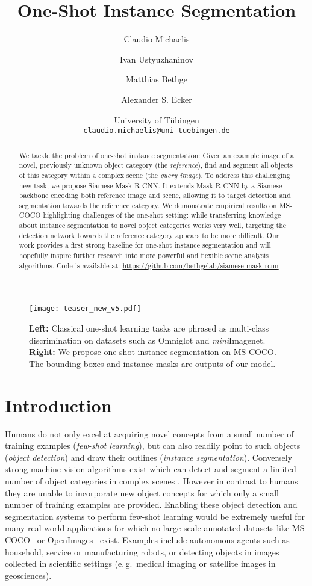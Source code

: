 \documentclass{article}
\title{One-Shot Instance Segmentation}
\author{Claudio Michaelis\\
\and
Ivan Ustyuzhaninov\\
\and
Matthias Bethge\\
\and
Alexander S. Ecker\\
\and
University of T\"ubingen\\
{\tt\small claudio.michaelis@uni-tuebingen.de}
}
\newcommand{\coco}{MS-COCO\xspace}
\begin{document}
\maketitle

\begin{abstract}
   We tackle the problem of one-shot instance segmentation: Given an example image of a novel, previously unknown object category (the \emph{reference}), find and segment all objects of this category within a complex scene (the \emph{query image}).
   To address this challenging new task, we propose Siamese Mask R-CNN. It extends Mask R-CNN by a Siamese backbone encoding both reference image and scene, allowing it to target detection and segmentation towards the reference category.
   We demonstrate empirical results on \coco highlighting challenges of the one-shot setting: while transferring knowledge about instance segmentation to novel object categories works very well, targeting the detection network towards the reference category appears to be more difficult.
   Our work provides a first strong baseline for one-shot instance segmentation and will hopefully inspire further research into more powerful and flexible scene analysis algorithms. Code is available at: \url{https://github.com/bethgelab/siamese-mask-rcnn}
\end{abstract}

\begin{figure}[h]
    \centering
    \texttt{[image: teaser\_new\_v5.pdf]}
    \caption{\textbf{Left:} Classical one-shot learning tasks are phrased as multi-class discrimination on datasets such as Omniglot and \emph{mini}Imagenet. \textbf{Right:} We propose one-shot instance segmentation on \coco.
The bounding boxes and instance masks are outputs of our model.}
    \label{fig:teaser}
\end{figure}

\section{Introduction}
\label{sec:introduction}



Humans do not only excel at acquiring novel concepts from a small number of training examples (\emph{few-shot learning}), but can also readily point to such objects (\emph{object detection}) and draw their outlines (\emph{instance segmentation}). Conversely strong machine vision algorithms exist which can detect and segment a limited number of object categories in complex scenes \cite{Redmon2018, Lin2017b, He2017}. However in contrast to humans they are unable to incorporate new object concepts for which only a small number of training examples are provided. Enabling these object detection and segmentation systems to perform few-shot learning would be extremely useful for many real-world applications for which no large-scale annotated datasets like \coco~\cite{Lin2014} or OpenImages~\cite{Krasin2017} exist. Examples include autonomous agents such as household, service or manufacturing robots, or detecting objects in images collected in scientific settings (e.\,g.\ medical imaging or satellite images in geosciences).
\end{document}
